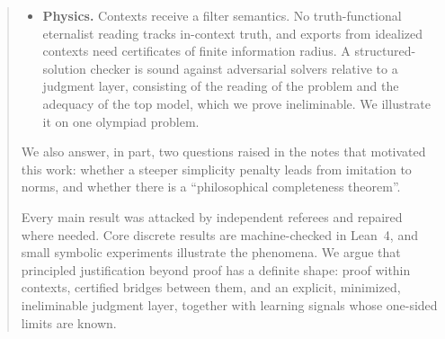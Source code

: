 \begin{abstract}
\begin{itemize}
\item \textbf{Physics.} Contexts receive a filter semantics. No truth-functional eternalist reading tracks in-context truth, and exports from idealized contexts need certificates of finite information radius. A structured-solution checker is sound against adversarial solvers relative to a judgment layer, consisting of the reading of the problem and the adequacy of the top model, which we prove ineliminable. We illustrate it on one olympiad problem.
\end{itemize}
We also answer, in part, two questions raised in the notes that motivated this work: whether a steeper simplicity penalty leads from imitation to norms, and whether there is a ``philosophical completeness theorem''.

Every main result was attacked by independent referees and repaired where needed. Core discrete results are machine-checked in Lean~4, and small symbolic experiments illustrate the phenomena. We argue that principled justification beyond proof has a definite shape: proof within contexts, certified bridges between them, and an explicit, minimized, ineliminable judgment layer, together with learning signals whose one-sided limits are known.
\end{abstract}
